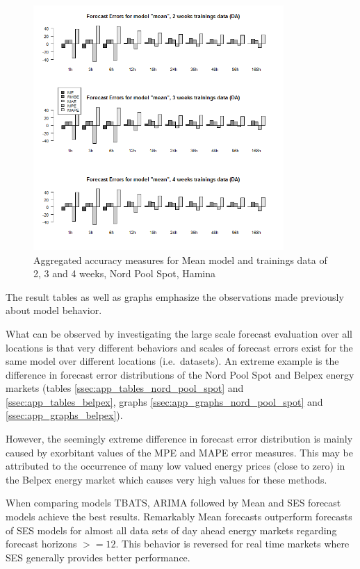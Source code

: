 \begin{figure}[htbp]
	\centering
		\includegraphics[width=0.85\textwidth]{figures/forecasting/da_sim_1_x_1w_1w_mean.png}
	\caption{Aggregated accuracy measures for Mean model and trainings data of 2, 3 and 4 weeks, Nord Pool Spot, Hamina}
	\label{fig:da_sim_1_x_1w_1w_mean}
\end{figure}


The result tables as well as graphs emphasize the observations made previously about model behavior. 

What can be observed by investigating the large scale forecast evaluation over all locations is that very different behaviors and scales of forecast errors exist for the same model over different locations (i.e.~datasets). An extreme example is the difference in forecast error distributions of the Nord Pool Spot and Belpex energy markets (tables \ref{ssec:app_tables_nord_pool_spot} and \ref{ssec:app_tables_belpex}, graphs \ref{ssec:app_graphs_nord_pool_spot} and \ref{ssec:app_graphs_belpex}). 

However, the seemingly extreme difference in forecast error distribution is mainly caused by exorbitant values of the MPE and MAPE error measures. This may be attributed to the occurrence of many low valued energy prices (close to zero) in the Belpex energy market which causes very high values for these methods. 

When comparing models TBATS, ARIMA followed by Mean and SES forecast models achieve the best results. Remarkably Mean forecasts outperform forecasts of SES models for almost all data sets of day ahead energy markets regarding forecast horizons $>= 12$. This behavior is reversed for real time markets where SES generally provides better performance. 

